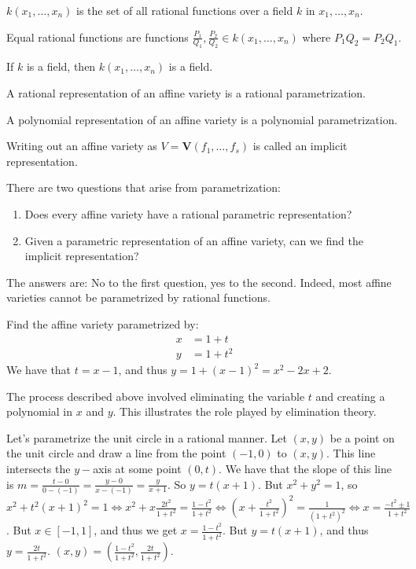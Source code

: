 \documentclass[crop=false,class=book,oneside]{standalone}
\begin{document}
\begin{definition}
$k(x_1,\hdots ,x_n)$ is the set of all rational functions over a field $k$ in $x_1,\hdots, x_n$.
\end{definition}
\begin{definition}
Equal rational functions are functions $\frac{P_1}{Q_1}, \frac{P_2}{Q_2} \in k(x_1,\hdots ,x_n)$ where $P_1Q_2 = P_2Q_1$.
\end{definition}
\begin{theorem}
If $k$ is a field, then $k(x_1,\hdots ,x_n)$ is a field.
\end{theorem}
\begin{definition}
A rational representation of an affine variety is a rational parametrization.
\end{definition}
\begin{definition}
A polynomial representation of an affine variety is a polynomial parametrization.
\end{definition}
\begin{remark}
Writing out an affine variety as $V=\mathbf{V}(f_{1},\hdots,f_{s})$ is called an implicit representation.
\end{remark}
There are two questions that arise from parametrization:
\begin{enumerate}
    \item Does every affine variety have a rational parametric representation?
    \item Given a parametric representation of an affine variety, can we find the implicit representation?
\end{enumerate}
The answers are: No to the first question, yes to the second. Indeed, most affine varieties cannot be parametrized by rational functions.
\begin{example}
Find the affine variety parametrized by:
\begin{align*}
    x&=1+t\\
    y&=1+t^{2}
\end{align*}
We have that $t=x-1$, and thus $y=1+(x-1)^{2}=x^{2}-2x+2$.
\end{example}
\begin{remark}
The process described above involved eliminating the variable $t$ and creating a polynomial in $x$ and $y$. This illustrates the role played by elimination theory.
\end{remark}
\begin{example}
Let's parametrize the unit circle in a rational manner. Let $(x,y)$ be a point on the unit circle and draw a line from the point $(-1,0)$ to $(x,y)$. This line intersects the $y-$axis at some point $(0,t)$. We have that the slope of this line is $m =\frac{t-0}{0-(-1)}=\frac{y-0}{x-(-1)}=\frac{y}{x+1}$. So $y=t(x+1)$. But $x^{2}+y^{2}=1$, so $x^2+t^{2}(x+1)^{2}=1\Leftrightarrow x^{2}+x\frac{2t^{2}}{1+t^{2}}=\frac{1-t^2}{1+t^2}\Leftrightarrow (x+\frac{t^{2}}{1+t^{2}})^{2}=\frac{1}{(1+t^{2})^{2}}\Leftrightarrow x=\frac{-t^{2}\pm 1}{1+t^{2}}$. But $x\in [-1,1]$, and thus we get $x = \frac{1-t^2}{1+t^2}$. But $y = t(x+1)$, and thus $y = \frac{2t}{1+t^2}$. $(x,y)=(\frac{1-t^{2}}{1+t^{2}},\frac{2t}{1+t^{2}})$.
\end{example}
\end{document}
